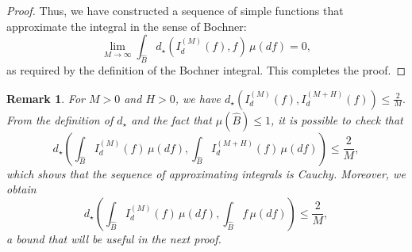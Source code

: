 \documentclass[a4paper, 11pt]{article}
\newtheorem{rem}{Remark}
\theoremstyle{definition}
\begin{document}
{\begin{proof}
Thus, we have constructed a sequence of simple functions that approximate the integral in the sense of Bochner:
\[
\lim_{M \to \infty} \int_{\widehat{B}} d_\star\left( I_d^{(M)}(f), f \right) \, \mu(df) = 0,
\]
as required by the definition of the Bochner integral. This completes the proof.
\end{proof}
\begin{rem}{\label{rk: Cauchy}}
For $M > 0$ and $H > 0$, we have $d_\star\left( I_d^{(M)}(f), I_d^{(M+H)}(f) \right) \le \frac{2}{M}.$
From the definition of $d_\star$ and the fact that $\mu(\widehat{B}) \le 1$, it is possible to check that
\[
d_\star \left( \int_{\widehat{B}} I_d^{(M)}(f) \, \mu(df), \int_{\widehat{B}} I_d^{(M+H)}(f) \, \mu(df) \right) \le \frac{2}{M},
\]
which shows that the sequence of approximating integrals is Cauchy. Moreover, we obtain
\begin{equation}\label{eq : approx Bochner d star}
d_\star \left( \int_{\widehat{B}} I_d^{(M)}(f) \, \mu(df), \int_{\widehat{B}} f \, \mu(df) \right) \le \frac{2}{M},
\end{equation}
a bound that will be useful in the next proof.
\end{rem}
}
\end{document}
